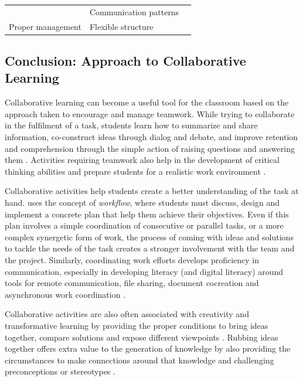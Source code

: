 \begin{table}[]
\begin{tabularx}{\textwidth}{@{}lXX@{}}
                                                                      & Communication patterns                                         & \textcite{jahng_2010,amponsah_2003}                                          \\  
\multirow{-4}{*}{Proper management}                                   & Flexible structure                                             & \textcite{gross_1997,jacobs_2015}                                            \\ \bottomrule
\end{tabularx}
\label{tab:2-1}
\end{table}

\subsection{Conclusion: Approach to Collaborative Learning \label{sec:2-1-5}}

Collaborative learning can become a useful tool for the classroom based on the approach taken to encourage and manage teamwork. While trying to collaborate in the fulfilment of a task, students learn how to summarize and share information, co-construct ideas through dialog and
debate, and improve retention and comprehension through the simple action of raising questions and answering them \parencite{andrews_2015}. Activities requiring teamwork also help in the development of critical thinking abilities \parencite{zandvakili_2019} and prepare students for
a realistic work environment \parencite{chowdhury_2002}.

Collaborative activities help students create a better understanding of the task at hand. \textcite{salmons_2019} uses the concept of \emph{workflow}, where students must discuss, design and implement a concrete plan that help them achieve their objectives. Even if this plan involves
a simple coordination of consecutive or parallel tasks, or a more complex synergetic form of work, the process of coming with ideas and solutions to tackle the needs of the task creates a stronger involvement with the team and the project. Similarly, coordinating work efforts develops
proficiency in communication, especially in developing literacy (and digital literacy) around tools for remote communication, file sharing, document cocreation and asynchronous work coordination \parencite{lo_2009,murphy_2001}.

Collaborative activities are also often associated with creativity and transformative learning by providing the proper conditions to bring ideas together, compare solutions and expose different viewpoints \parencite{peppler_2011,turnbull_2010}. Rubbing ideas together offers extra value
to the generation of knowledge by also providing the circumstances to make connections around that knowledge and challenging preconceptions or stereotypes \parencite{eden_2024,cesar_2006}.

